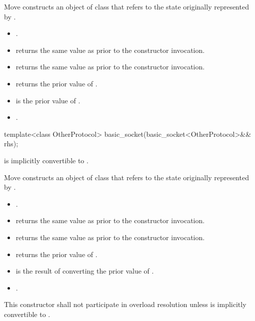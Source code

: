 \begin{itemdescr}
\pnum
\effects Move constructs an object of class  that refers to the state originally represented by .

\pnum
\postconditions
\begin{itemize}
\item
{}.
\item
{} returns the same value as  prior to the constructor invocation.
\item
{} returns the same value as  prior to the constructor invocation.
\item
{} returns the prior value of .
\item
{} is the prior value of .
\item
{}.
\end{itemize}
\end{itemdescr}

\begin{itemdecl}
template<class OtherProtocol>
  basic_socket(basic_socket<OtherProtocol>&& rhs);
\end{itemdecl}

\begin{itemdescr}
\pnum
\requires {} is implicitly convertible to .

\pnum
\effects Move constructs an object of class  that refers to the state originally represented by .

\pnum
\postconditions
\begin{itemize}
\item
{}.
\item
{} returns the same value as  prior to the constructor invocation.
\item
{} returns the same value as  prior to the constructor invocation.
\item
{} returns the prior value of .
\item
{} is the result of converting the prior value of .
\item
{}.
\end{itemize}

\pnum
\remarks This constructor shall not participate in overload resolution unless  is implicitly convertible to .
\end{itemdescr}



